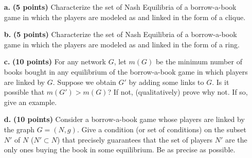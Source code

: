 \documentclass[11pt]{article}
\begin{document}
\begin{itemize}
\item[\textbf{a.}] \textbf{(5 points)} Characterize the set of Nash Equilibria of a borrow-a-book game in which the players are modeled as and linked in the form of a clique. 
\item[\textbf{b.}] \textbf{(5 points)}  Characterize the set of Nash Equilibria of a borrow-a-book game in which the players are modeled as and linked in the form of a ring. 
\item[\textbf{c.}]  \textbf{(10 points)} For any network $G$, let $m(G)$ be the minimum number of books bought in any equilibrium of the borrow-a-book game in which players are linked by $G$. Suppose we obtain $G'$ by adding some links to $G$. Is it possible that $m(G')>m(G)$? If not, (qualitatively) prove why not. If so, give an example.
\item[\textbf{d.}]  \textbf{(10 points)} Consider a borrow-a-book game whose players are linked by the graph $G=(N,g)$. Give a condition (or set of conditions) on the subset $N'$ of $N$ ($N'\subset N$) that precisely guarantees that the set of players $N'$ are the only ones buying the book in some equilibrium. Be as precise as possible.
\end{itemize}
\end{document}
